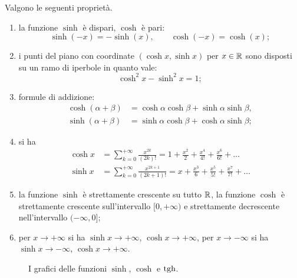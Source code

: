 \begin{theorem}
Valgono le seguenti proprietà.
\begin{enumerate}
\item
la funzione $\sinh$ è dispari, $\cosh$ è pari:
\[
\sinh(-x) = -\sinh(x),
\qquad
\cosh(-x) = \cosh(x);
\]

\item
i punti del piano con coordinate $(\cosh x, \sinh x)$
per $x\in {\mathbb R}$
sono disposti su un ramo di iperbole in quanto vale:
\[
  \cosh^2 x - \sinh^2 x = 1;
\]

\item formule di addizione:
\begin{align*}
  \cosh(\alpha+\beta) &= \cosh \alpha \cosh \beta + \sinh \alpha \sinh \beta,\\
  \sinh(\alpha+\beta) &= \sinh \alpha \cosh \beta + \cosh \alpha \sinh \beta;
\end{align*}

\item si ha
\begin{align*}
  \cosh x
  &= \sum_{k=0}^{+\infty} \frac{x^{2k}}{(2k)!}
  = 1 + \frac{x^2}{2} + \frac{x^4}{4!} + \frac{x^6}{6!} + \dots \\
  \sinh x
  &= \sum_{k=0}^{+\infty} \frac{x^{2k+1}}{(2k+1)!}
  = x + \frac{x^3}{6} + \frac{x^5}{5!} + \frac{x^7}{7!} + \dots
\end{align*}

\item
la funzione $\sinh$ è strettamente crescente su tutto ${\mathbb R}$,
la funzione $\cosh$
è strettamente crescente sull'intervallo
$[0,+\infty)$ e strettamente decrescente
nell'intervallo $(-\infty,0]$;

\item per $x\to +\infty$ si ha $\sinh x \to +\infty$, $\cosh x \to +\infty$, 
per $x\to -\infty$ si ha $\sinh x \to -\infty$, $\cosh x \to +\infty$.

\end{enumerate}
\end{theorem}

\newsavebox{\qrfigiperb}%
\begin{figure}
  \centering%
  \caption{%
    I grafici delle funzioni $\sinh$, $\cosh$ e $\operatorname{tgh}$.\\\\
    \usebox{\qrfigiperb}%
  }
\end{figure}

